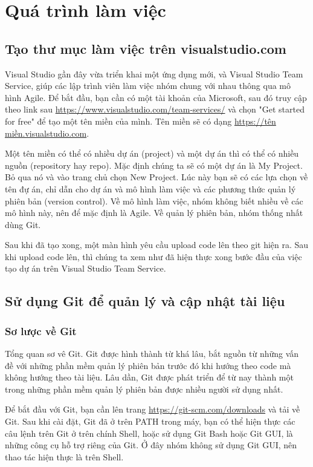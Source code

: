\documentclass[12pt,a4paper]{report}
\begin{document}
	\section{Quá trình làm việc}
		\subsection{Tạo thư mục làm việc trên visualstudio.com}

		Visual Studio gần đây vừa triển khai một ứng dụng mới, và Visual Studio Team Service, giúp các lập trình viên làm việc nhóm chung với nhau thông qua mô hình Agile. Để bắt đầu, bạn cần có một tài khoản của Microsoft, sau đó truy cập theo link sau \url{https://www.visualstudio.com/team-services/} và chọn "Get started for free" để tạo một tên miền của mình. Tên miền sẽ có dạng \url{https://tên miền.visualstudio.com}.\par
		Một tên miền có thể có nhiều dự án (project) và một dự án thì có thể có nhiều nguồn (repository hay repo). Mặc định chúng ta sẽ có một dự án là My Project. Bỏ qua nó và vào trang chủ chọn New Project. Lúc này bạn sẽ có các lựa chọn về tên đự án, chỉ dẫn cho dự án và mô hình làm việc và các phương thức quản lý phiên bản (version control). Về mô hình làm việc, nhóm không biết nhiều về các mô hình này, nên để mặc định là Agile. Về quản lý phiên bản, nhóm thống nhất dùng Git.\par
		Sau khi đã tạo xong, một màn hình yêu cầu upload code lên theo git hiện ra. Sau khi upload code lên, thì chúng ta xem như đã hiện thực xong bước đầu của việc tạo dự án trên Visual Studio Team Service.

		\subsection{Sử dụng Git để quản lý và cập nhật tài liệu}
			\subsubsection{Sơ lược về Git}
		Tổng quan sơ vê Git. Git được hình thành từ khá lâu, bắt nguồn từ những vấn đề với những phần mềm quản lý phiên bản trước đó khi hướng theo code mà không hướng theo tài liệu. Lâu dần, Git được phát triển để từ nay thành một trong những phần mềm quản lý phiên bản được nhiều người sử dụng nhất. \par
		Để bắt đầu với Git, bạn cần lên trang \url{https://git-scm.com/downloads} và tải về Git. Sau khi cài đặt, Git đã ở trên PATH trong máy, bạn có thể hiện thực các câu lệnh trên Git ở trên chính Shell, hoặc sử dụng Git Bash hoặc Git GUI, là những công cụ hỗ trợ riêng của Git. Ở đây nhóm không sử dụng Git GUI, nên thao tác hiện thực là trên Shell.\par
\end{document}
